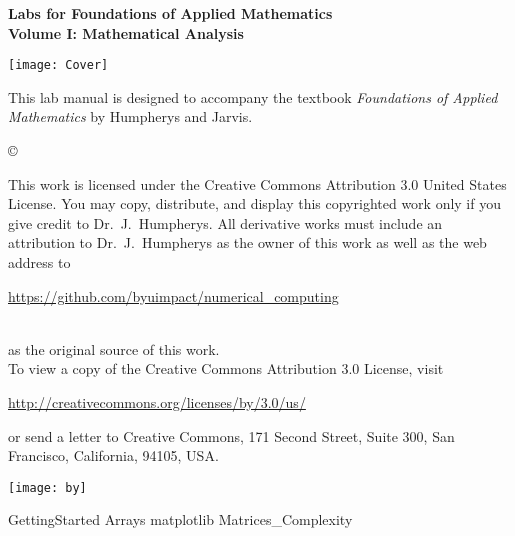 \documentclass[nociteref]{SIAM-GH-book}
\begin{document}



\thispagestyle{empty}
\begin{center}
 
{\huge \bf Labs for Foundations of Applied Mathematics} \\
\vspace{5mm}
{\Large \bf Volume I: Mathematical Analysis}
\vspace{20mm}

\texttt{[image: Cover]}
\end{center}
\frontmatter




\begin{thepreface}
This lab manual is designed to accompany the textbook \emph{Foundations of Applied Mathematics} by Humpherys and Jarvis.

\vfill
\copyright{This work is licensed under the Creative Commons Attribution 3.0 United States
License.  You may copy, distribute, and display this copyrighted work only if you give
credit to Dr.~J.~Humpherys. All derivative works must include an attribution to Dr.~J.~Humpherys as the owner of this work as well as the web address to
\\\centerline{\url{https://github.com/byuimpact/numerical_computing}}\\ as the original source of
this
work.\\To view a copy of the Creative Commons Attribution 3.0 License,
visit\\\centerline{\url{http://creativecommons.org/licenses/by/3.0/us/}} or send a letter to
Creative Commons, 171 Second Street, Suite 300, San Francisco, California, 94105, USA.}

\vfill
\centering\texttt{[image: by]}
\vfill
\end{thepreface}

\setcounter{tocdepth}{1}
\tableofcontents

\mainmatter
{GettingStarted}
{Arrays}
{matplotlib}
{Matrices_Complexity}
\end{document}

